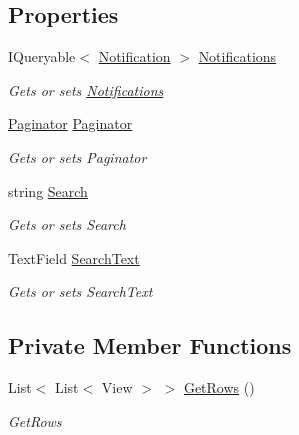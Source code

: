 \subsection*{Properties}
\begin{DoxyCompactItemize}
\item 
I\+Queryable$<$ \mbox{\hyperlink{class_gtd_app_1_1_data_1_1_notification}{Notification}} $>$ \mbox{\hyperlink{class_gtd_app_1_1_console_1_1_views_1_1_notifications_1_1_list_notifications_view_a12294529db80affa4ad8d83abf023827}{Notifications}}
\begin{DoxyCompactList}\small\item\em Gets or sets \mbox{\hyperlink{namespace_gtd_app_1_1_console_1_1_views_1_1_notifications}{Notifications}} \end{DoxyCompactList}\item 
\mbox{\hyperlink{class_gtd_app_1_1_repository_1_1_paginator}{Paginator}} \mbox{\hyperlink{class_gtd_app_1_1_console_1_1_views_1_1_notifications_1_1_list_notifications_view_aca13f9d3382acf8ec8fad527c86e324d}{Paginator}}
\begin{DoxyCompactList}\small\item\em Gets or sets Paginator \end{DoxyCompactList}\item 
string \mbox{\hyperlink{class_gtd_app_1_1_console_1_1_views_1_1_notifications_1_1_list_notifications_view_a8c66fb9d8cea09d85bb0d8fae48790f7}{Search}}
\begin{DoxyCompactList}\small\item\em Gets or sets Search \end{DoxyCompactList}\item 
Text\+Field \mbox{\hyperlink{class_gtd_app_1_1_console_1_1_views_1_1_notifications_1_1_list_notifications_view_a3187322904a1c3b42d468c706a36e8f9}{Search\+Text}}
\begin{DoxyCompactList}\small\item\em Gets or sets Search\+Text \end{DoxyCompactList}\end{DoxyCompactItemize}
\subsection*{Private Member Functions}
\begin{DoxyCompactItemize}
\item 
List$<$ List$<$ View $>$ $>$ \mbox{\hyperlink{class_gtd_app_1_1_console_1_1_views_1_1_notifications_1_1_list_notifications_view_ae4bb4411164d6eda943b77427ea3d642}{Get\+Rows}} ()
\begin{DoxyCompactList}\small\item\em Get\+Rows \end{DoxyCompactList}\end{DoxyCompactItemize}
